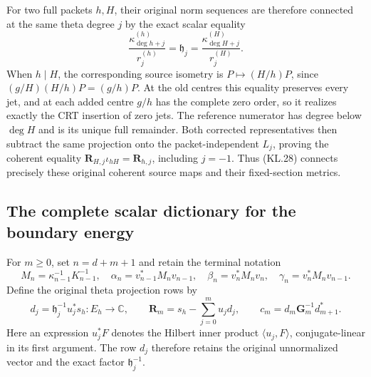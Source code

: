 For two full packets \(h,H\), their original norm sequences are
therefore connected at the same theta degree \(j\) by the exact
scalar equality
\[
 \frac{\kappa_{\deg h+j}^{(h)}}{r_j^{(h)}}
    =\mathfrak h_j
    =\frac{\kappa_{\deg H+j}^{(H)}}{r_j^{(H)}}.           \tag{KL.28}
\]
When \(h\mid H\), the corresponding source isometry is
\(P\mapsto(H/h)P\), since
\((g/H)(H/h)P=(g/h)P\).  At the old centres this equality
preserves every jet, and at each added centre \(g/h\) has the
complete zero order, so it realizes exactly the CRT insertion of
zero jets.  The reference numerator has degree below \(\deg H\)
and is its unique full remainder.  Both corrected representatives
then subtract the same projection onto the packet-independent
\(L_j\), proving the coherent equality
\(\mathbf R_{H,j}\iota_{hH}=\mathbf R_{h,j}\), including
\(j=-1\).  Thus (KL.28) connects precisely these original
coherent source maps and their fixed-section metrics.

\subsection{The complete scalar dictionary for the boundary energy}

For \(m\geq0\), set \(n=d+m+1\) and retain the terminal
notation
\[
 M_n=\kappa_{n-1}^{-1}K_{n-1}^{-1},\quad
 \alpha_n=v_{n-1}^*M_nv_{n-1},\quad
 \beta_n=v_n^*M_nv_n,\quad
 \gamma_n=v_n^*M_nv_{n-1}.
\]
Define the original theta projection rows by
\[
 d_j=\mathfrak h_j^{-1}u_j^*s_h:E_h\to\mathbb C,
 \qquad
 \mathbf R_m=s_h-\sum_{j=0}^m u_jd_j,
 \qquad c_m=d_m\mathbf G_m^{-1}d_{m+1}^*.
                                                               \tag{KL.29}
\]
Here an expression \(u_j^*F\) denotes the Hilbert inner product
\(\langle u_j,F\rangle\), conjugate-linear in its first
argument.  The row \(d_j\) therefore retains the original
unnormalized vector and the exact factor \(\mathfrak h_j^{-1}\).

